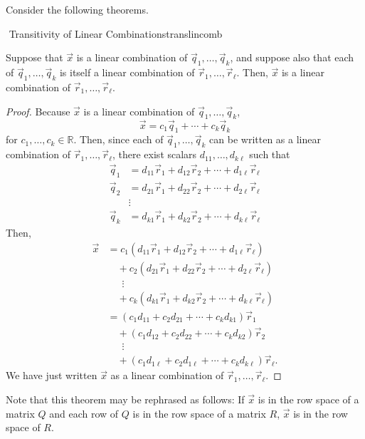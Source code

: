         \pagebreak
        \vphantom
        \\
        \\
        Consider the following theorems.
        \begin{theorem}{\Stop\,\,Transitivity of Linear Combinations}{translincomb}
        
            Suppose that \(\vec{x}\) is a linear combination of \(\vec{q}_1,\ldots,\vec{q}_k\), and suppose also that each of \(\vec{q}_1,\ldots,\vec{q}_k\) is itself a linear combination of \(\vec{r}_1,\ldots,\vec{r}_\ell\). Then, \(\vec{x}\) is a linear combination of \(\vec{r}_1,\ldots,\vec{r}_\ell\).
            \begin{proof}
                Because \(\vec{x}\) is a linear combination of \(\vec{q}_1,\ldots,\vec{q}_k\), 
                \begin{equation*}
                    \vec{x}=c_1\vec{q}_1+\cdots+c_k\vec{q}_k
                \end{equation*}
                for \(c_1,\ldots,c_k\in\mathbb{R}\). Then, since each of \(\vec{q}_1,\ldots,\vec{q}_k\) can be written as a linear combination of \(\vec{r}_1,\ldots,\vec{r}_\ell\), there exist scalars \(d_{11},\ldots,d_{k\ell}\) such that
                \begin{align*}
                    \vec{q}_1&=d_{11}\vec{r}_1+d_{12}\vec{r}_2+\cdots+d_{1\ell}\vec{r}_\ell \\
                    \vec{q}_2&=d_{21}\vec{r}_1+d_{22}\vec{r}_2+\cdots+d_{2\ell}\vec{r}_\ell \\
                    &\vdots \\
                    \vec{q}_k&=d_{k1}\vec{r}_1+d_{k2}\vec{r}_2+\cdots+d_{k\ell}\vec{r}_\ell
                \end{align*}
                Then,
                \begin{align*}
                    \vec{x}&=c_1(d_{11}\vec{r}_1+d_{12}\vec{r}_2+\cdots+d_{1\ell}\vec{r}_\ell) \\
                    &\quad+c_2(d_{21}\vec{r}_1+d_{22}\vec{r}_2+\cdots+d_{2\ell}\vec{r}_\ell) \\
                    &\quad\,\,\,\vdots \\
                    &\quad+c_k(d_{k1}\vec{r}_1+d_{k2}\vec{r}_2+\cdots+d_{k\ell}\vec{r}_\ell) \\
                    &=(c_1d_{11}+c_2d_{21}+\cdots+c_kd_{k1})\vec{r}_1 \\
                    &\quad+(c_1d_{12}+c_2d_{22}+\cdots+c_kd_{k2})\vec{r}_2 \\
                    &\quad\,\,\,\vdots \\\
                    &\quad+(c_1d_{1\ell}+c_2d_{1\ell}+\cdots+c_kd_{k\ell})\vec{r}_\ell.
                \end{align*}
                We have just written \(\vec{x}\) as a linear combination of \(\vec{r}_1,\ldots,\vec{r}_\ell\).
            \end{proof}
            Note that this theorem may be rephrased as follows: If \(\vec{x}\) is in the row space of a matrix \(Q\) and each row of \(Q\) is in the row space of a matrix \(R\), \(\vec{x}\) is in the row space of \(R\).
        \end{theorem}
